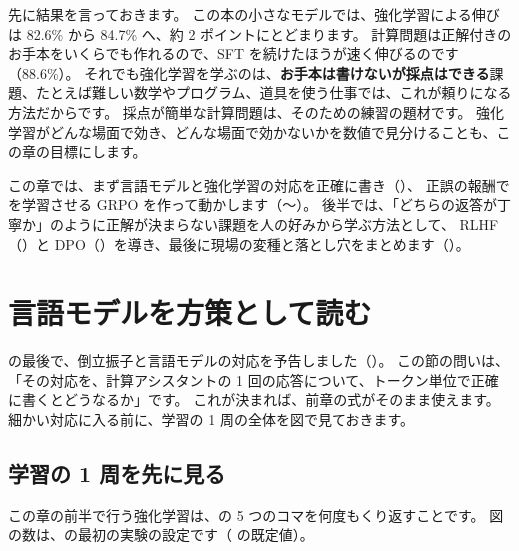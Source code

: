先に結果を言っておきます。
この本の小さなモデルでは、強化学習による伸びは 82.6\% から 84.7\% へ、約 2 ポイントにとどまります。
計算問題は正解付きのお手本をいくらでも作れるので、SFT を続けたほうが速く伸びるのです（88.6\%）。
それでも強化学習を学ぶのは、\textbf{お手本は書けないが採点はできる}課題、たとえば難しい数学やプログラム、道具を使う仕事では、これが頼りになる方法だからです。
採点が簡単な計算問題は、そのための練習の題材です。
強化学習がどんな場面で効き、どんな場面で効かないかを数値で見分けることも、この章の目標にします。

この章では、まず言語モデルと強化学習の対応を正確に書き（）、
正誤の報酬で  を学習させる GRPO を作って動かします（〜）。
後半では、「どちらの返答が丁寧か」のように正解が決まらない課題を人の好みから学ぶ方法として、
RLHF（）と DPO（）を導き、最後に現場の変種と落とし穴をまとめます（）。

\section{言語モデルを方策として読む}\label{sec:rl-map}

の最後で、倒立振子と言語モデルの対応を予告しました（）。
この節の問いは、「その対応を、計算アシスタントの 1 回の応答について、トークン単位で正確に書くとどうなるか」です。
これが決まれば、前章の式がそのまま使えます。
細かい対応に入る前に、学習の 1 周の全体を図で見ておきます。

\subsection{学習の 1 周を先に見る}\label{sec:rl-cycle}

この章の前半で行う強化学習は、の 5 つのコマを何度もくり返すことです。
図の数は、の最初の実験の設定です（ の既定値）。

